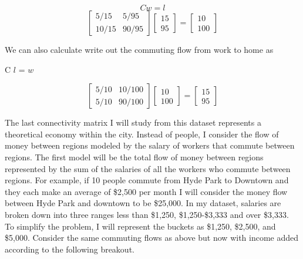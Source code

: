\documentclass{article}
\theoremstyle{definition}
\theoremstyle{remark}
\begin{document}
\begin{equation}C w = l\end{equation}
\begin{equation} 
  \begin{bmatrix}
    5/15 & 5/95\\
    10/15 & 90/95
  \end{bmatrix}
  \begin{bmatrix}
    15\\
    95
  \end{bmatrix}
  = 
  \begin{bmatrix}
    10\\
    100
  \end{bmatrix}
\end{equation}

We can also calculate write out the commuting flow from work to home as

\begin{center}C $l$ = $w$\end{center}
\begin{equation} 
  \begin{bmatrix}
    5/10 & 10/100\\
    5/10 & 90/100
  \end{bmatrix}
  \begin{bmatrix}
    10\\
    100
  \end{bmatrix}
  = 
  \begin{bmatrix}
    15\\
    95
  \end{bmatrix}
\end{equation}

The last connectivity matrix I will study from this dataset represents a theoretical economy within the city.  Instead of people, I consider the flow of money between regions modeled by the salary of workers that commute between regions.  The first model will be the total flow of money between regions represented by the sum of the salaries of all the workers who commute between regions.  For example, if 10 people commute from Hyde Park to Downtown and they each make an average of \$2,500 per month I will consider the money flow between Hyde Park and downtown to be \$25,000.  In my dataset, salaries are broken down into three ranges less than \$1,250, \$1,250-\$3,333 and over \$3,333.  To simplify the problem, I will represent the buckets as \$1,250, \$2,500, and \$5,000.  Consider the same commuting flows as above but now with income added according to the following breakout.\\
\end{document}
